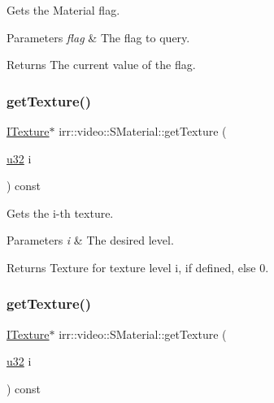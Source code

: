 Gets the Material flag. 


\begin{DoxyParams}{Parameters}
{\em flag} & The flag to query. \\
\hline
\end{DoxyParams}
\begin{DoxyReturn}{Returns}
The current value of the flag. 
\end{DoxyReturn}
\mbox{\label{classirr_1_1video_1_1SMaterial_ad5883da3db8087fbbb74f7bb23e82874}} 
\subsubsection{\texorpdfstring{get\+Texture()}{getTexture()}\hspace{0.1cm}{\footnotesize\ttfamily [1/2]}}
{\footnotesize\ttfamily \hyperlink{classirr_1_1video_1_1ITexture}{I\+Texture}$\ast$ irr\+::video\+::\+S\+Material\+::get\+Texture (\begin{DoxyParamCaption}\item[{\hyperlink{namespaceirr_a0416a53257075833e7002efd0a18e804}{u32}}]{i }\end{DoxyParamCaption}) const\hspace{0.3cm}{\ttfamily [inline]}}



Gets the i-\/th texture. 


\begin{DoxyParams}{Parameters}
{\em i} & The desired level. \\
\hline
\end{DoxyParams}
\begin{DoxyReturn}{Returns}
Texture for texture level i, if defined, else 0. 
\end{DoxyReturn}
\mbox{\label{classirr_1_1video_1_1SMaterial_ad5883da3db8087fbbb74f7bb23e82874}} 
\subsubsection{\texorpdfstring{get\+Texture()}{getTexture()}\hspace{0.1cm}{\footnotesize\ttfamily [2/2]}}
{\footnotesize\ttfamily \hyperlink{classirr_1_1video_1_1ITexture}{I\+Texture}$\ast$ irr\+::video\+::\+S\+Material\+::get\+Texture (\begin{DoxyParamCaption}\item[{\hyperlink{namespaceirr_a0416a53257075833e7002efd0a18e804}{u32}}]{i }\end{DoxyParamCaption}) const\hspace{0.3cm}{\ttfamily [inline]}}



